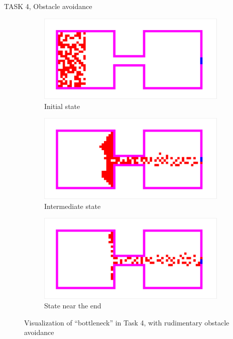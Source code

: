 \documentclass[10pt,a4paper]{article}
\begin{document}
\begin{task}{TASK 4, Obstacle avoidance}
\begin{figure}[htbp]
  \centering
  \begin{subfigure}[b]{0.31\textwidth}
    \includegraphics[width=\textwidth]{pictures/Task4_initial_br.png}
    \caption{Initial state}
    \label{fig:Task4_initial_br}
  \end{subfigure}
  \begin{subfigure}[b]{0.31\textwidth}
    \includegraphics[width=\textwidth]{pictures/Task4_intermediate_br.png}
    \caption{Intermediate state}
    \label{fig:Task4_intermediate_br}
  \end{subfigure}
  \begin{subfigure}[b]{0.31\textwidth}
    \includegraphics[width=\textwidth]{pictures/Task4_end_br.png}
    \caption{State near the end}
    \label{fig:Task4_end_br}
  \end{subfigure}
  \caption{Visualization of ``bottleneck'' in Task 4, with rudimentary obstacle avoidance}
  \label{fig:task4br}
\end{figure}


\end{task}
\end{document}
